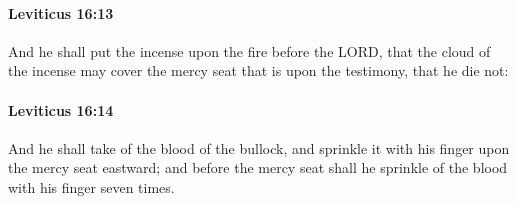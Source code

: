 		\paragraph{Leviticus 16:13} %
			\label{LEVITICUS-16-13}

			And he shall put the incense upon the fire before the LORD, that the cloud of the incense may cover the mercy seat that is upon the testimony, that he die not:


		\paragraph{Leviticus 16:14} %
			\label{LEVITICUS-16-14}

			And he shall take of the blood of the bullock, and sprinkle it with his finger upon the mercy seat eastward; and before the mercy seat shall he sprinkle of the blood with his finger seven times.

